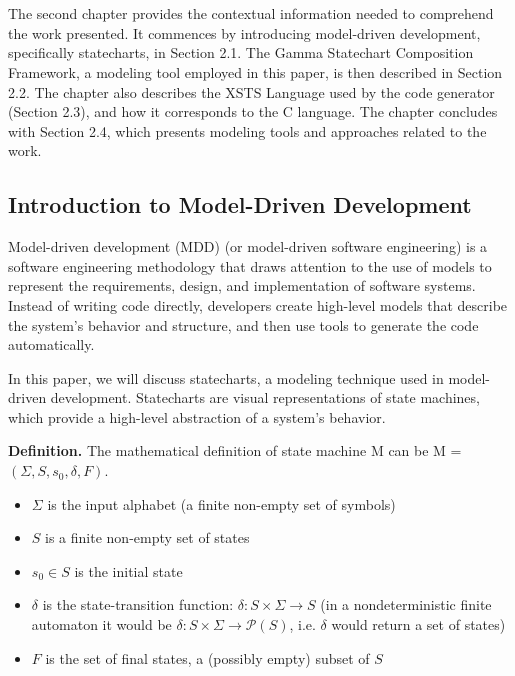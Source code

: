 
\chapter{\hatter}

The second chapter provides the contextual information needed to comprehend the work presented. It commences by introducing model-driven development, specifically statecharts, in Section 2.1. The Gamma Statechart Composition Framework, a modeling tool employed in this paper, is then described in Section 2.2. The chapter also describes the XSTS Language used by the code generator (Section 2.3), and how it corresponds to the C language. The chapter concludes with Section 2.4, which presents modeling tools and approaches related to the work.

\section{Introduction to Model-Driven Development}

Model-driven development\cite{MDD} (MDD) (or model-driven software engineering) is a software engineering methodology that draws attention to the use of models to represent the requirements, design, and implementation of software systems. Instead of writing code directly, developers create high-level models that describe the system's behavior and structure, and then use tools to generate the code automatically.

In this paper, we will discuss statecharts, a modeling technique used in model-driven development. Statecharts are visual representations of state machines\cite{StateMachine}, which provide a high-level abstraction of a system's behavior.

\textbf{Definition.} The mathematical definition of state machine M can be M = $(\Sigma, S, s_0, \delta, F)$.

\begin{itemize}
	\item $\Sigma$ is the input alphabet (a finite non-empty set of symbols)
	\item $S$ is a finite non-empty set of states
	\item $s_0 \in S$ is the initial state
	\item $\delta$ is the state-transition function: $\delta:S \times \Sigma \rightarrow S$ (in a nondeterministic finite automaton it would be $\delta:S \times \Sigma \rightarrow \mathcal{P}(S)$, i.e. $\delta$ would return a set of states)
	\item $F$ is the set of final states, a (possibly empty) subset of $S$
\end{itemize}

